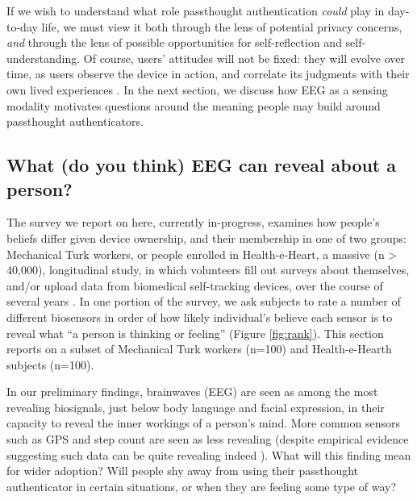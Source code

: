 \documentclass[sigconf]{acmart}
\begin{document}
If we wish to understand what role passthought authentication \emph{could} play in day-to-day life,
we must view it both through the lens of potential privacy concerns, \emph{and} through the lens of possible opportunities for self-reflection and self-understanding. 
Of course, users' attitudes will not be fixed: they will evolve over time, as users observe the device in action, and correlate its judgments with their own lived experiences \cite{Nafus2016}.
In the next section, we discuss how EEG as a sensing modality motivates questions around the meaning people may build around passthought authenticators.


\subsection{What (do you think) EEG can reveal about a person?}
\label{sec:org0e23305}

The survey we report on here, currently in-progress, examines how people's beliefs differ given device ownership, and their membership in one of two groups: Mechanical Turk workers, or people enrolled in Health-e-Heart, a massive (n > 40,000), longitudinal study, in which volunteers fill out surveys about themselves, and/or upload data from biomedical self-tracking devices, over the course of several years \cite{Estrin2010a}.
In one portion of the survey, we ask subjects to rate a number of different biosensors in order of how likely individual's believe each sensor is to reveal what ``a person is thinking or feeling'' (Figure \ref{fig:rank}).
This section reports on a subset of Mechanical Turk workers (n=100) and Health-e-Hearth subjects (n=100).

In our preliminary findings, brainwaves (EEG) are seen as among the most revealing biosignals, just below body language and facial expression, in their capacity to reveal the inner workings of a person's mind. 
More common sensors such as GPS and step count are seen as less revealing (despite empirical evidence suggesting such data can be quite revealing indeed \cite{Canzian2015}).
What will this finding mean for wider adoption? 
Will people shy away from using their passthought authenticator in certain situations, or when they are feeling some type of way?
\end{document}
